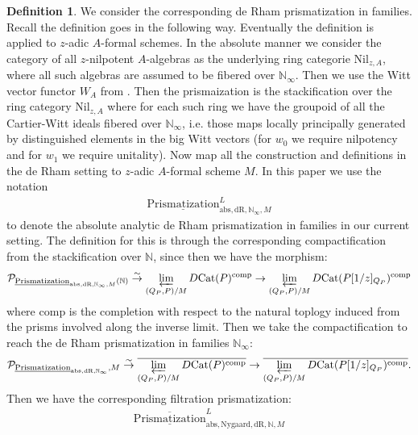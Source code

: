 \documentclass[12pt]{article}
\theoremstyle{definition}
\newtheorem{definition}{Definition}
\begin{document}
\begin{definition}
We consider the corresponding de Rham prismatization in families. Recall the definition goes in the following way. Eventually the definition is applied to $z$-adic $A$-formal schemes. In the absolute manner we consider the category of all $z$-nilpotent $A$-algebras as the underlying ring categorie $\mathrm{Nil}_{z,A}$, where all such algebras are assumed to be fibered over $\mathbb{N}_\infty$. Then we use the Witt vector functor $W_A$ from \cite{3LH}. Then the prismaization is the stackification over the ring category $\mathrm{Nil}_{z,A}$ where for each such ring we have the groupoid of all the Cartier-Witt ideals fibered over $\mathbb{N}_\infty$, i.e. those maps locally principally generated by distinguished elements in the big Witt vectors (for $w_0$ we require nilpotency and for $w_1$ we require unitality). Now map all the construction and definitions in the de Rham setting to $z$-adic $A$-formal scheme $M$. In this paper we use the notation 
\begin{align}
\underline{\mathrm{Prismatization}}^L_{\mathrm{abs},\mathrm{dR},\mathbb{N}_\infty,M}
\end{align}
to denote the absolute analytic de Rham prismatization in families in our current setting. The definition for this is through the corresponding compactification from the stackification over $\mathbb{N}$, since then we have the morphism:
\begin{align}
\mathcal{P}_{\underline{\mathrm{Prismatization}}_{\mathrm{abs},\mathrm{dR},\mathbb{N}_\infty,M}(\mathbb{N})} \overset{\sim}{\rightarrow} \varprojlim_{(Q_P,P)/M} D\mathrm{Cat}(P)^\mathrm{comp}\rightarrow \varprojlim_{(Q_P,P)/M} D\mathrm{Cat}(P[1/z]_{Q_P})^\mathrm{comp}
\end{align}
where $\mathrm{comp}$ is the completion with respect to the natural toplogy induced from the prisms involved along the inverse limit. Then we take the compactification to reach the de Rham prismatization in families $\mathbb{N}_\infty$:
\begin{align}
\mathcal{P}_{\underline{\mathrm{Prismatization}}_{\mathrm{abs},\mathrm{dR},\mathbb{N}_\infty},M} \overset{\sim}{\rightarrow} \overline{\varprojlim_{(Q_P,P)/M} D\mathrm{Cat}(P)^\mathrm{comp}}\rightarrow \overline{\varprojlim_{(Q_P,P)/M} D\mathrm{Cat}(P[1/z]_{Q_P})^\mathrm{comp}}.
\end{align}
Then we have the corresponding filtration prismatization:
\begin{align}
\overline{\underline{\mathrm{Prismatization}}}^L_{\mathrm{abs},\mathrm{Nygaard},\mathrm{dR},\mathbb{N},M}

\end{align}
\end{definition}
\end{document}
